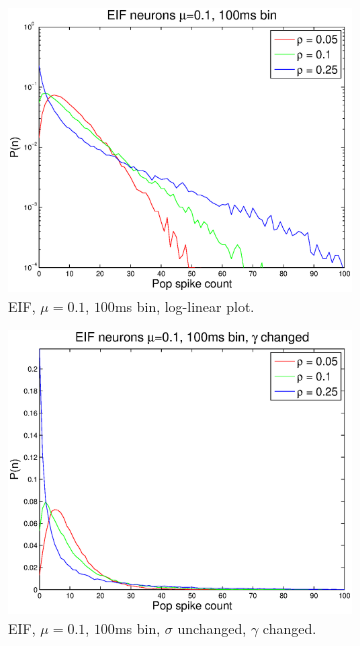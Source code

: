 \documentclass[11pt]{article}
\begin{document}
\begin{figure}[H]
\begin{subfigure}[h]{0.5\textwidth}
	\includegraphics[width=\textwidth]{../Figures/EIF/EIF_Macke_2a_100ms_semilog}
	\caption{\footnotesize EIF, $\mu = 0.1$, $100$ms bin, log-linear plot.}
	\label{fig6}
	\end{subfigure}
	\begin{subfigure}[h]{0.5\textwidth}
	\centering
	\includegraphics[width=\textwidth]{../Figures/EIF/EIF_Macke_2a_100ms_gamma}
	\caption{\footnotesize EIF, $\mu = 0.1$, $100$ms bin, $\sigma$ unchanged, $\gamma$ changed.}
	\label{fig3}
	\end{subfigure}
	\begin{subfigure}[h]{0.5\textwidth}

\end{subfigure}
\end{figure}
\end{document}
